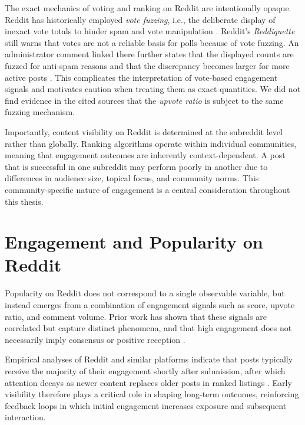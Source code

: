 The exact mechanics of voting and ranking on Reddit are intentionally opaque. Reddit has historically employed \emph{vote fuzzing}, i.e., the deliberate display of inexact vote totals to hinder spam and vote manipulation \cite{stoddard2015popularity,redditReddiquette,redditJedbergVoteFuzzing}. Reddit’s \textit{Reddiquette}\cite{reddit_reddiquette} still warns that votes are not a reliable basis for polls because of vote fuzzing. An administrator comment linked there further states that the displayed counts are fuzzed for anti-spam reasons and that the discrepancy becomes larger for more active posts \cite{redditReddiquette,redditJedbergVoteFuzzing}. This complicates the interpretation of vote-based engagement signals and motivates caution when treating them as exact quantities. We did not find evidence in the cited sources that the \textit{upvote ratio} is subject to the same fuzzing mechanism.

Importantly, content visibility on Reddit is determined at the subreddit level rather than globally. Ranking algorithms operate within individual communities, meaning that engagement outcomes are inherently context-dependent. A post that is successful in one subreddit may perform poorly in another due to differences in audience size, topical focus, and community norms.\cite{chandrasekharan2018internet, zhang2017community, hamilton2017loyalty} This community-specific nature of engagement is a central consideration throughout this thesis.


\section{Engagement and Popularity on Reddit}

Popularity on Reddit does not correspond to a single observable variable, but instead emerges from a combination of engagement signals such as score, upvote ratio, and comment volume. Prior work has shown that these signals are correlated but capture distinct phenomena, and that high engagement does not necessarily imply consensus or positive reception \cite{hessel2019something}.

Empirical analyses of Reddit and similar platforms indicate that posts typically receive the majority of their engagement shortly after submission, after which attention decays as newer content replaces older posts in ranked listings \cite{terentiev2014predicting,wigsnes2019predicting}. Early visibility therefore plays a critical role in shaping long-term outcomes, reinforcing feedback loops in which initial engagement increases exposure and subsequent interaction.

